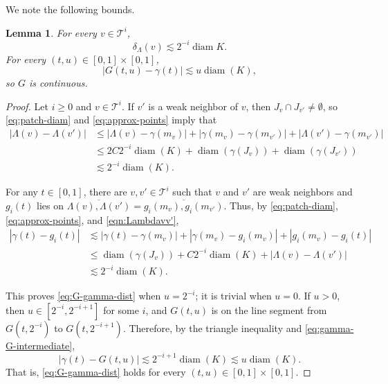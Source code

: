 \documentclass[12pt,reqno]{amsart}
\newcommand{\cT}{\mathcal{T}}
\newtheorem{lemma}[thm]{Lemma}
\theoremstyle{remark}
\newcommand{\0}{\mathbf{0}}
\renewcommand{\1}{\mathbf 1}
\DeclareMathOperator{\diam}{diam}
\begin{document}
We note the following bounds. 
\begin{lemma}\label{lem:nbhd-diam}
  For every $v\in \cT^i$,
  \begin{equation}\label{eq:delta-lambda-bound}
    \delta_\Lambda(v) \lesssim 2^{-i}\diam K.
  \end{equation}
  For every $(t,u) \in [0,1]\times [0,1]$,
  \begin{equation}\label{eq:G-gamma-dist}
    |G(t,u) - \gamma(t)| \lesssim u \diam(K),
  \end{equation}
  so $G$ is continuous.
\end{lemma}
\begin{proof}
  Let $i\ge 0$ and $v\in \cT^i$. If $v'$ is a weak neighbor of $v$, then $J_v\cap J_{v'}\ne \emptyset$, so \eqref{eq:patch-diam} and \eqref{eq:approx-points} imply that
  \begin{equation}\label{eqn:Lambdavv'}
  \begin{aligned}
  |\Lambda(v) - \Lambda(v')| &\le |\Lambda(v) - \gamma(m_v)| + |\gamma(m_v) - \gamma(m_{v'})| + |\Lambda(v') - \gamma(m_{v'})|\\
  &\le 2 C 2^{-i} \diam(K) + \diam(\gamma(J_v)) + \diam(\gamma(J_{v'})) \\
  &\lesssim 2^{-i} \diam(K).
  \end{aligned}
  \end{equation}

  For any $t\in [0,1]$, there are $v,v'\in \cT^i$ such that $v$ and $v'$ are weak neighbors and $g_i(t)$ lies on $\overline{\Lambda(v), \Lambda(v')} = \overline{g_i(m_v), g_i(m_{v'})}$. Thus, by \eqref{eq:patch-diam}, \eqref{eq:approx-points}, and \eqref{eqn:Lambdavv'},
  \begin{equation}\label{eq:gamma-G-intermediate}
  \begin{aligned}
    |\gamma(t) - g_i(t)| & \lesssim |\gamma(t) - \gamma(m_v)| + |\gamma(m_v) - g_i(m_v)| + |g_i(m_v) - g_i(t)|\\
    & \le \diam(\gamma(J_v)) + C 2^{-i}\diam(K) + |\Lambda(v) - \Lambda(v')| \\
    & \lesssim 2^{-i}\diam(K).
    \end{aligned}
  \end{equation}

  This proves \eqref{eq:G-gamma-dist} when $u=2^{-i}$; it is trivial when $u=0$. If $u>0$, then $u\in [2^{-i},2^{-i+1}]$ for some $i$, and $G(t,u)$ is on the line segment from $G(t,2^{-i})$ to $G(t,2^{-i+1})$. Therefore, by the triangle inequality and \eqref{eq:gamma-G-intermediate},
  $$
  |\gamma(t) - G(t,u)| \lesssim 2^{-i+1}\diam(K) \lesssim u\diam(K).
  $$
  That is, \eqref{eq:G-gamma-dist} holds for every $(t,u)\in [0,1]\times [0,1]$.


\end{proof}
\end{document}
